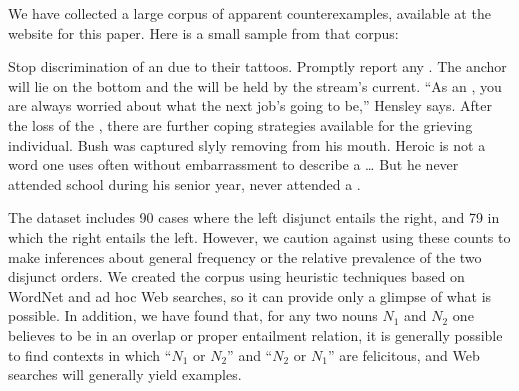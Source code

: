 \documentclass[12pt,twoside]{article}
\renewcommand{\_}{\textbf{\textunderscore\hspace{-4pt}\textunderscore\hspace{-3pt}\textunderscore\hspace{-4pt}\textunderscore}\hspace{0.5pt}}			%
\begin{document}
We have collected a large corpus of apparent counterexamples,
available at the website for this paper. Here is a small sample from
that corpus:
%
\begin{exe}
\ex\label{ourcorpus} 
  \begin{xlist}
  \ex Stop discrimination of an  due
    to their tattoos.
  \ex Promptly report any .
  \ex The anchor will lie on the bottom and the  will be held by the stream's current.
  \ex ``As an , you are always worried
    about what the next job's going to be,'' Hensley says.
  \ex After the loss of the , there are
    further coping strategies available for the grieving individual.
  \ex Bush was captured slyly removing 
    from his mouth.
  \ex Heroic is not a word one uses often without embarrassment to
    describe a  \ldots
  \ex But he never attended school during his senior year, never
    attended a .
  \end{xlist}
\end{exe}

The dataset includes 90 cases where the left disjunct entails the
right, and 79 in which the right entails the left.  However, we
caution against using these counts to make inferences about general
frequency or the relative prevalence of the two disjunct orders. We
created the corpus using heuristic techniques based on WordNet
\citep{WordNet98} and ad hoc Web searches, so it can provide only a
glimpse of what is possible.  In addition, we have found that, for any
two nouns $N_{1}$ and $N_{2}$ one believes to be in an overlap or
proper entailment relation, it is generally possible to find contexts
in which ``$N_{1}$ or $N_{2}$'' and ``$N_{2}$ or $N_{1}$'' are
felicitous, and Web searches will generally yield examples.
\end{document}
